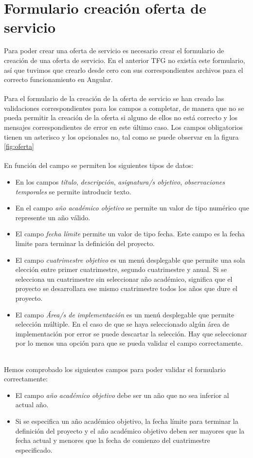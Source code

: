 \documentclass[11pt]{book}
\begin{document}
 \section{Formulario creación oferta de servicio}
 Para poder crear una oferta de servicio es necesario crear el formulario de creación de una oferta de servicio. En el anterior TFG no existía este formulario, así que tuvimos que crearlo desde cero con sus correspondientes archivos para el correcto funcionamiento en Angular.\\\\
 Para el formulario de la creación de la oferta de servicio se han creado las validaciones correspondientes para los campos a completar, de manera que no se pueda permitir la creación de la oferta si alguno de ellos no está correcto y los mensajes correspondientes de error en este último caso. Los campos obligatorios tienen un asterisco y los opcionales no, tal como se puede observar en la figura \ref{fig:oferta}\\\\
 En función del campo se permiten los siguientes tipos de datos: \\
 \begin{itemize} 
 	\item En los campos \emph{título}, \emph{descripción}, \emph{asignatura/s objetivo}, \emph{observaciones temporales} se permite introducir texto.
 	\item En el campo \emph{año académico objetivo} se permite un valor de tipo numérico que represente un año válido.
 	\item El campo \emph{fecha límite} permite un valor de tipo fecha. Este campo es la fecha limite para terminar la definición del proyecto.
 	\item  El campo \emph{cuatrimestre objetivo} es un menú desplegable que permite una sola elección entre primer cuatrimestre, segundo cuatrimestre y anual. Si se selecciona un cuatrimestre sin seleccionar año académico, significa que el proyecto se desarrollara ese mismo cuatrimestre todos los años que dure el proyecto.
 	\item El campo \emph{Área/s de implementación} es un menú desplegable que permite selección múltiple. En el caso de que se haya seleccionado algún área de implementación por error se puede descartar la selección. Hay que seleccionar por lo menos una opción para que se pueda validar el campo correctamente.\\\\
 \end{itemize}
 Hemos comprobado los siguientes campos para poder validar el formulario correctamente:
 \begin{itemize} 
 	\item	El campo \emph{año académico objetivo} debe ser un año que no sea inferior al actual año.
 	\item	Si se especifica un año académico objetivo, la fecha límite para terminar la definición del proyecto y el año académico objetivo deben ser mayores que la fecha actual y menores que la fecha de comienzo del cuatrimestre especificado.\\\\
 \end{itemize}
 
\end{document}
